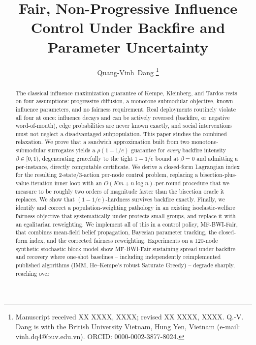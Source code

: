 \documentclass[journal]{IEEEtran}
\begin{document}
\title{Fair, Non-Progressive Influence Control Under Backfire and Parameter Uncertainty}

\author{Quang-Vinh~Dang
\thanks{Manuscript received XX XXXX, XXXX; revised XX XXXX, XXXX. Q.-V.
Dang is with the British University Vietnam, Hung Yen, Vietnam (e-mail:
vinh.dq4@buv.edu.vn). ORCID: 0000-0002-3877-8024.}}


\maketitle

\begin{abstract}
The classical influence maximization guarantee of Kempe, Kleinberg, and Tardos
rests on four assumptions: progressive diffusion, a monotone submodular
objective, known influence parameters, and no fairness requirement. Real
deployments routinely violate all four at once: influence decays and can be
actively reversed (backfire, or negative word-of-mouth), edge probabilities
are never known exactly, and social interventions must not neglect a
disadvantaged subpopulation. This paper studies the combined relaxation. We
prove that a sandwich approximation built from two monotone-submodular
surrogates yields a $\rho(1-1/e)$ guarantee for \emph{every} backfire
intensity $\beta \in [0,1)$, degenerating gracefully to the tight $1-1/e$
bound at $\beta=0$ and admitting a per-instance, directly computable
certificate. We derive a closed-form Lagrangian index for the resulting
2-state/3-action per-node control problem, replacing a bisection-plus-value-iteration
inner loop with an $O(Km+n\log n)$-per-round procedure that we measure to be
roughly two orders of magnitude faster than the bisection oracle it replaces.
We show that $(1-1/e)$-hardness survives backfire exactly. Finally, we
identify and correct a population-weighting
pathology in an existing isoelastic-welfare fairness objective that
systematically under-protects small groups, and replace it with an
egalitarian reweighting. We implement all of this in a control policy,
MF-BWI-Fair, that combines mean-field belief propagation, Bayesian parameter
tracking, the closed-form index, and the corrected fairness reweighting.
Experiments on a 120-node synthetic stochastic block model show
MF-BWI-Fair sustaining spread under backfire and recovery where one-shot
baselines -- including independently reimplemented published algorithms
(IMM, He--Kempe's robust Saturate Greedy) -- degrade sharply, reaching over

\end{abstract}
\end{document}
